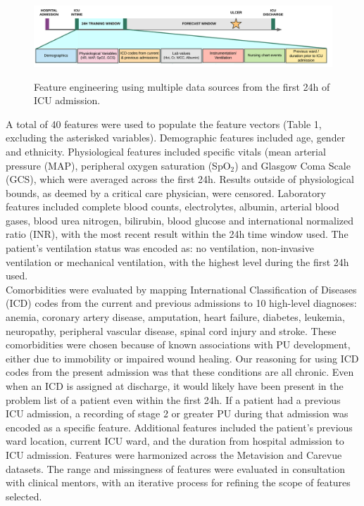 \documentclass{ws-procs11x85}
\begin{document}
\begin{figure}[H]
  \centering
  \includegraphics[width=1.05\textwidth]{figures/egems_fig2.png}
  \label{fig-feature-eng}
  \caption{\footnotesize Feature engineering using multiple data sources from the first 24h of ICU admission.}
\end{figure}

\newpage
\noindent
A total of 40 features were used to populate the feature vectors (Table 1, excluding the asterisked variables). Demographic features included age, gender and ethnicity. Physiological features included specific vitals (mean arterial pressure (MAP), peripheral oxygen saturation (SpO$_{2}$) and Glasgow Coma Scale (GCS), which were averaged across the first 24h. Results outside of physiological bounds, as deemed by a critical care physician, were censored. Laboratory features included complete blood counts, electrolytes, albumin, arterial blood gases, blood urea nitrogen, bilirubin, blood glucose and international normalized ratio (INR), with the most recent result within the 24h time window used. The patient's ventilation status was encoded as: no ventilation, non-invasive ventilation or mechanical ventilation, with the highest level during the first 24h used. \\

\noindent
Comorbidities were evaluated by mapping International Classification of Diseases (ICD) codes from the current and previous admissions to 10 high-level diagnoses: anemia, coronary artery disease, amputation, heart failure, diabetes, leukemia, neuropathy, peripheral vascular disease, spinal cord injury and stroke. These comorbidities were chosen because of known associations with PU development, either due to immobility or impaired wound healing. Our reasoning for using ICD codes from the present admission was that these conditions are all chronic. Even when an ICD is assigned at discharge, it would likely have been present in the problem list of a patient even within the first 24h. If a patient had a previous ICU admission, a recording of stage 2 or greater PU during that admission was encoded as a specific feature. Additional features included the patient's previous ward location, current ICU ward, and the duration from hospital admission to ICU admission. Features were harmonized across the Metavision and Carevue datasets. The range and missingness of features were evaluated in consultation with clinical mentors, with an iterative process for refining the scope of features selected. 
\end{document}
